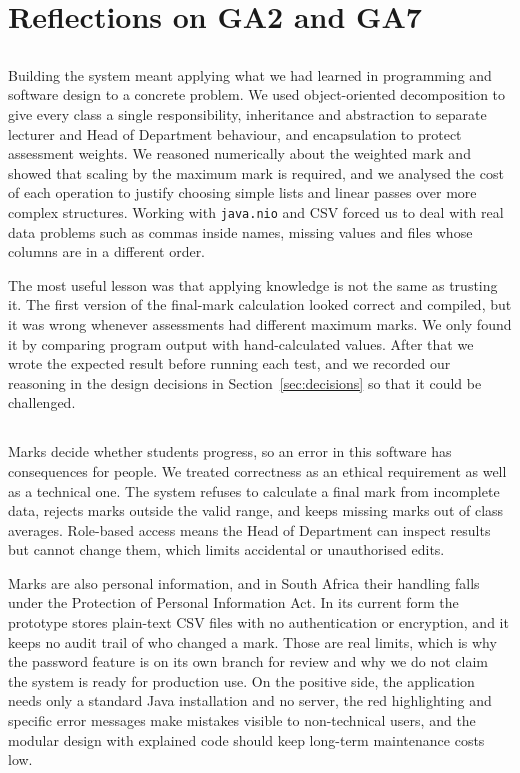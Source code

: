 \section{Reflections on GA2 and GA7}\label{sec:reflect}

\subsection{\gaTwoName}
Building the system meant applying what we had learned in programming and software design to a concrete problem. We used object-oriented decomposition to give every class a single responsibility, inheritance and abstraction to separate lecturer and Head of Department behaviour, and encapsulation to protect assessment weights. We reasoned numerically about the weighted mark and showed that scaling by the maximum mark is required, and we analysed the cost of each operation to justify choosing simple lists and linear passes over more complex structures. Working with \texttt{java.nio} and CSV forced us to deal with real data problems such as commas inside names, missing values and files whose columns are in a different order.

The most useful lesson was that applying knowledge is not the same as trusting it. The first version of the final-mark calculation looked correct and compiled, but it was wrong whenever assessments had different maximum marks. We only found it by comparing program output with hand-calculated values. After that we wrote the expected result before running each test, and we recorded our reasoning in the design decisions in Section~\ref{sec:decisions} so that it could be challenged.

\subsection{\gaSevenName}
Marks decide whether students progress, so an error in this software has consequences for people. We treated correctness as an ethical requirement as well as a technical one. The system refuses to calculate a final mark from incomplete data, rejects marks outside the valid range, and keeps missing marks out of class averages. Role-based access means the Head of Department can inspect results but cannot change them, which limits accidental or unauthorised edits.

Marks are also personal information, and in South Africa their handling falls under the Protection of Personal Information Act. In its current form the prototype stores plain-text CSV files with no authentication or encryption, and it keeps no audit trail of who changed a mark. Those are real limits, which is why the password feature is on its own branch for review and why we do not claim the system is ready for production use. On the positive side, the application needs only a standard Java installation and no server, the red highlighting and specific error messages make mistakes visible to non-technical users, and the modular design with explained code should keep long-term maintenance costs low.
